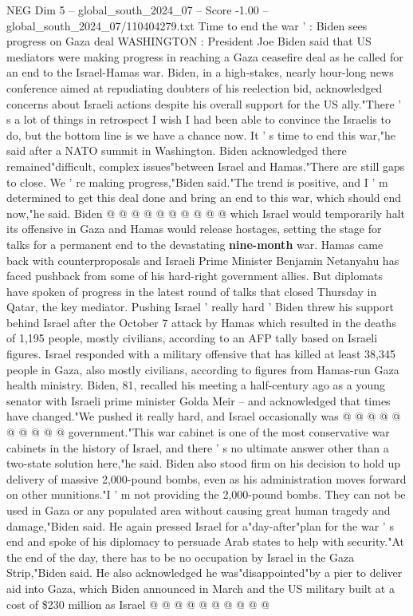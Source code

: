 \begin{textsample}{NEG Dim 5 – global\_south\_2024\_07 – Score -1.00 – global\_south\_2024\_07/110404279.txt}  \label{ex:f5_neg_275}
Time to end the war ' : Biden sees progress on Gaza deal WASHINGTON : President Joe Biden said that US mediators were making progress in reaching a Gaza ceasefire deal as he called for an end to the Israel-Hamas war.
Biden, in a high-stakes, nearly hour-long news conference aimed at repudiating doubters of his reelection bid, acknowledged concerns about Israeli actions despite his overall support for the US ally."There ' s a lot of things in retrospect I wish I had been able to convince the Israelis to do, but the bottom line is we have a chance now.
It ' s time to end this war,"he said after a NATO summit in Washington.
Biden acknowledged there remained"difficult, complex issues"between Israel and Hamas."There are still gaps to close.
We ' re making progress,"Biden said."The trend is positive, and I ' m determined to get this deal done and bring an end to this war, which should end now,"he said.
Biden @ @ @ @ @ @ @ @ @ @ which Israel would temporarily halt its offensive in Gaza and Hamas would release hostages, setting the stage for talks for a permanent end to the devastating \textbf{nine-month} war.
Hamas came back with counterproposals and Israeli Prime Minister Benjamin Netanyahu has faced pushback from some of his hard-right government allies.
But diplomats have spoken of progress in the latest round of talks that closed Thursday in Qatar, the key mediator.
Pushing Israel ' really hard ' Biden threw his support behind Israel after the October 7 attack by Hamas which resulted in the deaths of 1,195 people, mostly civilians, according to an AFP tally based on Israeli figures.
Israel responded with a military offensive that has killed at least 38,345 people in Gaza, also mostly civilians, according to figures from Hamas-run Gaza health ministry.
Biden, 81, recalled his meeting a half-century ago as a young senator with Israeli prime minister Golda Meir -- and acknowledged that times have changed."We pushed it really hard, and Israel occasionally was @ @ @ @ @ @ @ @ @ @ government."This war cabinet is one of the most conservative war cabinets in the history of Israel, and there ' s no ultimate answer other than a two-state solution here,"he said.
Biden also stood firm on his decision to hold up delivery of massive 2,000-pound bombs, even as his administration moves forward on other munitions."I ' m not providing the 2,000-pound bombs.
They can not be used in Gaza or any populated area without causing great human tragedy and damage,"Biden said.
He again pressed Israel for a"day-after"plan for the war ' s end and spoke of his diplomacy to persuade Arab states to help with security."At the end of the day, there has to be no occupation by Israel in the Gaza Strip,"Biden said.
He also acknowledged he was"disappointed"by a pier to deliver aid into Gaza, which Biden announced in March and the US military built at a cost of \$230 million as Israel @ @ @ @ @ @ @ @ @ @

\end{textsample}
